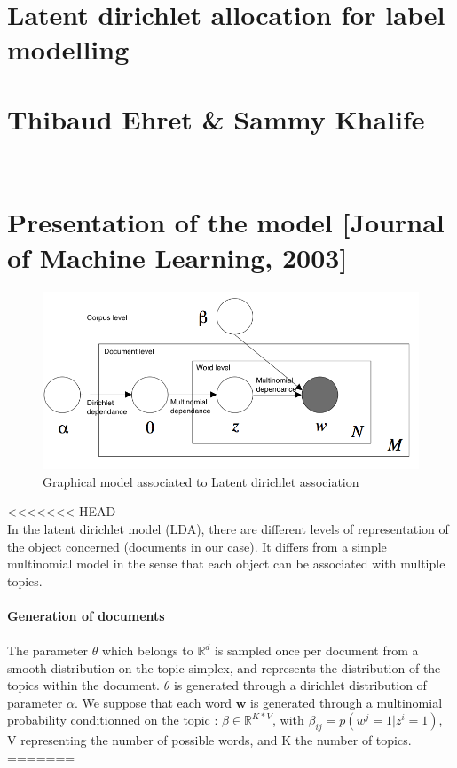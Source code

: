 \documentclass[12pt]{article}
\begin{document}
\section*{Latent dirichlet allocation for label modelling}
\section*{Thibaud Ehret \& Sammy Khalife}
~\\
\section*{Presentation of the model [Journal of Machine Learning, 2003]}
\begin{figure}[!h]
\centering
\captionsetup{justification=centering,margin=2cm}
\includegraphics[width=13cm]{LDA.png}
\caption{Graphical model associated to Latent dirichlet association}
\end{figure}
<<<<<<< HEAD
~\\
In the latent dirichlet model (LDA), there are different levels of representation of the object concerned (documents in our case). It differs from a simple multinomial model in the sense that each object can be associated with multiple topics. ~\\
~\\
\textbf{Generation of documents}~\\
~\\
The parameter $\theta$  which belongs to $\mathbb{R}^{d}$ is sampled once per document from a smooth distribution on the topic simplex, and represents the distribution of the topics within the document. $\theta$ is generated through a dirichlet distribution of parameter $\alpha$. We suppose that each word $\textbf{w}$ is generated through a multinomial probability conditionned on the topic : $\beta \in \mathbb{R}^{K*V}$, with $\beta_{ij}=p(w^{j}=1|z^{i}=1)$, V representing the number of possible words, and K the number of topics.
=======

\end{document}
